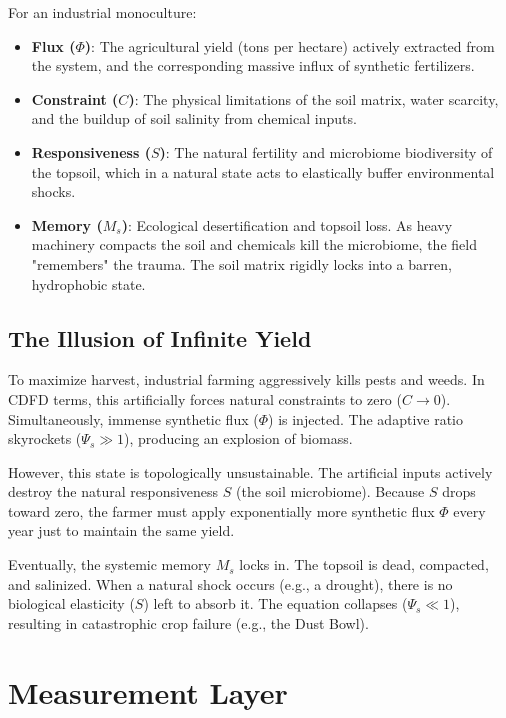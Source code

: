 \documentclass[11pt,a4paper]{article}
\begin{document}
For an industrial monoculture:
\begin{itemize}
    \item \textbf{Flux ($\Phi$)}: The agricultural yield (tons per hectare) actively extracted from the system, and the corresponding massive influx of synthetic fertilizers.
    \item \textbf{Constraint ($C$)}: The physical limitations of the soil matrix, water scarcity, and the buildup of soil salinity from chemical inputs.
    \item \textbf{Responsiveness ($S$)}: The natural fertility and microbiome biodiversity of the topsoil, which in a natural state acts to elastically buffer environmental shocks.
    \item \textbf{Memory ($M_s$)}: Ecological desertification and topsoil loss. As heavy machinery compacts the soil and chemicals kill the microbiome, the field "remembers" the trauma. The soil matrix rigidly locks into a barren, hydrophobic state.
\end{itemize}

\subsection{The Illusion of Infinite Yield}
To maximize harvest, industrial farming aggressively kills pests and weeds. In CDFD terms, this artificially forces natural constraints to zero ($C \to 0$). Simultaneously, immense synthetic flux ($\Phi$) is injected. The adaptive ratio skyrockets ($\Psi_s \gg 1$), producing an explosion of biomass.

However, this state is topologically unsustainable. The artificial inputs actively destroy the natural responsiveness $S$ (the soil microbiome). Because $S$ drops toward zero, the farmer must apply exponentially more synthetic flux $\Phi$ every year just to maintain the same yield.

Eventually, the systemic memory $M_s$ locks in. The topsoil is dead, compacted, and salinized. When a natural shock occurs (e.g., a drought), there is no biological elasticity ($S$) left to absorb it. The equation collapses ($\Psi_s \ll 1$), resulting in catastrophic crop failure (e.g., the Dust Bowl).



\section{Measurement Layer}

\end{document}
